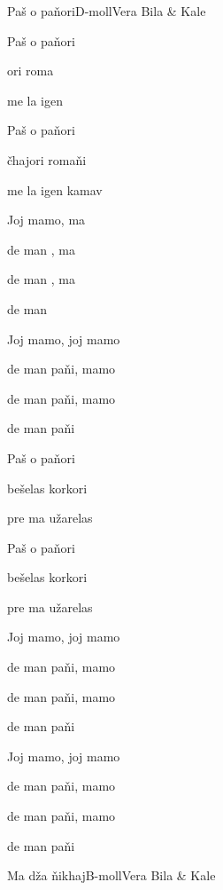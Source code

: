 \documentclass[a4paper,draft]{book}
\begin{document}
\begin{otherlanguage}{czech}

\begin{song}{Paš o paňori}{D-moll}{}{Vera Bila \& Kale}{}{}

\begin{SBVerse}
	Paš o paňori

	ori roma

	me la igen 

	Paš o paňori

	čhajori romaňi

	me la igen kamav
\end{SBVerse}

\begin{SBChorus}
	Joj mamo,  ma

	de man , ma

	de man , ma

	de man 

	Joj mamo, joj mamo

	de man paňi, mamo

	de man paňi, mamo

	de man paňi
\end{SBChorus}

\begin{SBVerse}
	Paš o paňori

	bešelas korkori

	pre ma užarelas

	Paš o paňori

	bešelas korkori

	pre ma užarelas
\end{SBVerse}

\begin{SBChorus}
	Joj mamo, joj mamo

	de man paňi, mamo

	de man paňi, mamo

	de man paňi

	Joj mamo, joj mamo

	de man paňi, mamo

	de man paňi, mamo

	de man paňi
\end{SBChorus}

\end{song}

\begin{song}{Ma dža ňikhaj}{B-moll}{}{Vera Bila \& Kale}{}{}


\end{song}
\end{otherlanguage}
\end{document}
